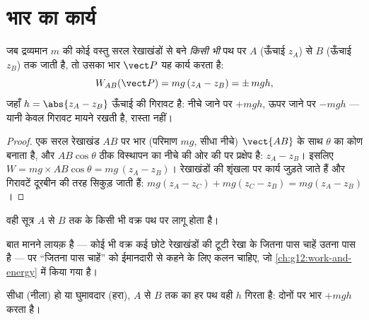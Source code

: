 \section{भार का कार्य}

\begin{proposition}[भार का कार्य]\label{prop:g11:work-of-force:weight}
जब द्रव्यमान $m$ की कोई वस्तु सरल रेखाखंडों से बने \emph{किसी भी} पथ पर
$A$ (ऊँचाई $z_A$) से $B$ (ऊँचाई $z_B$) तक जाती है, तो उसका
भार $\vect P$ यह कार्य करता है:
\[
W_{AB}(\vect P) = mg\,(z_A - z_B) = \pm\, mgh ,
\]
जहाँ $h = \abs{z_A - z_B}$ ऊँचाई की गिरावट है: नीचे जाने पर $+mgh$, ऊपर जाने पर $-mgh$ ---
यानी केवल गिरावट मायने रखती है, रास्ता नहीं।
\end{proposition}

\begin{proof}
एक सरल रेखाखंड $AB$ पर भार (परिमाण $mg$, सीधा नीचे) $\vect{AB}$ के
साथ $\theta$ का कोण बनाता है, और $AB\cos\theta$ ठीक विस्थापन का नीचे की ओर की
 पर प्रक्षेप है: $z_A - z_B$। इसलिए $W = mg \times AB\cos\theta = mg\,(z_A - z_B)$। रेखाखंडों की शृंखला पर
कार्य जुड़ते जाते हैं और गिरावटें दूरबीन की तरह सिकुड़ जाती हैं:
$mg(z_A - z_C) + mg(z_C - z_B) = mg(z_A - z_B)$।
\end{proof}

\begin{proposition}[कोई भी पथ]\label{prop:g11:work-of-force:anypath}
वही सूत्र $A$ से $B$ तक के किसी भी वक्र पथ पर लागू होता है।
\end{proposition}
\admitted

\begin{remark}\label{rem:g11:work-of-force:anypath}
बात मानने लायक़ है --- कोई भी वक्र कई छोटे रेखाखंडों की टूटी रेखा के जितना
पास चाहें उतना पास है --- पर ``जितना पास चाहें'' को ईमानदारी से कहने के लिए
कलन चाहिए, जो \cref{ch:g12:work-and-energy} में किया गया है।
\end{remark}

\begin{omfigure}

{\small सीधा (नीला) हो या घुमावदार (हरा), $A$ से $B$ तक का हर पथ वही
$h$ गिरता है: दोनों पर भार $+mgh$ करता है।}
\end{omfigure}

